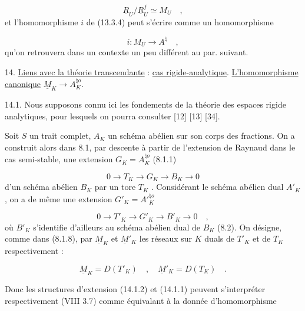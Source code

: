 
\begin{equation}\tag{13.5.12}
\underline{R}_U/\underline{R}^{f}_{U} \simeq M_U \quad ,
\end{equation}
et l'homomorphisme $i$ de (13.3.4) peut s'écrire comme un homomorphisme

\begin{equation}\tag{13.5.13}
i : M_U \longrightarrow A^{\natural} \quad ,
\end{equation}
qu'on retrouvera dans un contexte un peu différent au par. suivant.


14. \underline{Liens avec la théorie transcendante} : \underline{cas rigide-analytique}. \underline{L'homomorphisme canonique} $\underline{M}_K \longrightarrow A_K^{\natural o}$.

14.1. Nous supposons connu ici les fondements de la théorie des espaces rigide  analytiques, pour lesquels on pourra consulter [12] [13] [34].

Soit $S$ un trait complet, $A_K$ un schéma abélien sur son corps des fractions. On a construit alors dans 8.1, par descente à partir de l'extension de Raynaud dans le cas semi-stable, une extension $G_K = A_K^{\natural o}$ (8.1.1)

\begin{equation}\tag{14.1.1}
0 \longrightarrow T_K \longrightarrow G_K \longrightarrow B_K \longrightarrow 0
\end{equation}
d'un schéma abélien $B_K$ par un tore $T_K$ . Considérant le schéma abélien dual $A'_K$ , on a de même une extension $G'_K = A'{}^{\natural o}_{K}$

\begin{equation}\tag{14.1.2}
0 \longrightarrow T'_K \longrightarrow G'_K \longrightarrow B'_K \longrightarrow 0 \quad ,
\end{equation}
où $B'_K$ s'identifie d'ailleurs au schéma abélien dual de $B_K$ (8.2). On désigne, comme dans (8.1.8), par $\underline{M}_K$ et $\underline{M}'_K$ les réseaux sur $K$ duals de $T'_K$ et de $T_K$ respectivement :

\begin{equation}\tag{14.1.3}
\underline{M}_K = D(T'_K) \quad , \quad \underline{M}'_K = D(T_K) \quad .
\end{equation}


Donc les structures d'extension (14.1.2) et (14.1.1) peuvent s'interpréter respectivement (VIII 3.7) comme équivalant à la donnée d'homomorphisme

